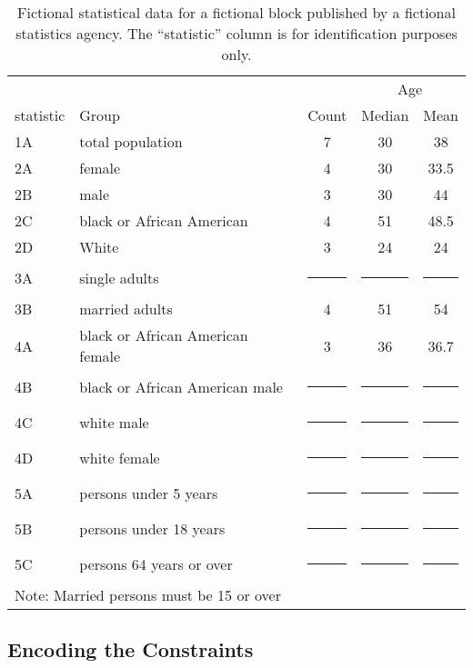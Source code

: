 \documentclass[runningheads]{llncs}
\begin{document}
\newcommand{\cens}{\multicolumn{1}{c|}{\rule{6mm}{3mm}}}
\begin{table}
\caption{Fictional statistical data for a fictional block published by
  a fictional statistics agency. The ``statistic'' column is for identification
  purposes only.\label{fictional}}
\begin{center}
\begin{tabular}{l|l|c|c|c|}
          &                           &       & \multicolumn{2}{|c|}{Age} \\
statistic & Group                     & Count & Median & Mean \\
\hline
       1A & total population          & 7     &  30    & 38 \\
\hline
       2A & female                    & 4     &  30    & 33.5 \\
       2B & male                      & 3     &  30    & 44 \\
       2C & black or African American & 4     &  51    & 48.5 \\
       2D & White                     & 3     &  24    & 24 \\
\hline
       3A & single adults             & \cens & \cens  & \cens \\
       3B & married adults            & 4     & 51     & 54 \\
\hline
       4A & black or African American female              & 3     & 36     & 36.7 \\
       4B & black or African American male                & \cens & \cens  & \cens \\
       4C & white male                & \cens & \cens  & \cens \\
       4D & white female              & \cens & \cens  & \cens \\
\hline
       5A & persons under 5 years     & \cens & \cens  & \cens \\
       5B & persons under 18 years    & \cens & \cens  & \cens \\
       5C & persons 64 years or over  & \cens & \cens  & \cens \\
\hline
\multicolumn{5}{l}{Note: Married persons must be 15 or over}
\end{tabular}
\end{center}
\end{table}

\subsection{Encoding the Constraints}
\end{document}
